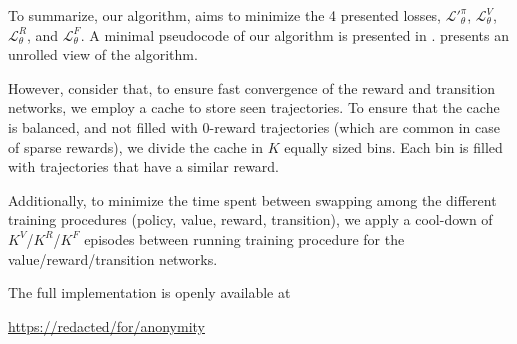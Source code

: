 To summarize, our algorithm, aims to minimize the 4 presented losses, $\mathcal{L'}_\theta^{\pi}$, $\mathcal{L}_\theta^V$, $\mathcal{L}_\theta^R$, and $\mathcal{L}_\theta^F$. A minimal pseudocode of our algorithm is presented in .  presents an unrolled view of the \fname{} algorithm.

However, consider that, to ensure fast convergence of the reward and transition networks, we employ a cache to store seen trajectories. To ensure that the cache is balanced, and not filled with $0$-reward trajectories (which are common in case of sparse rewards), we divide the cache in $K$ equally sized bins. Each bin is filled with trajectories that have a similar reward. 

Additionally, to minimize the time spent between swapping among the different training procedures (policy, value, reward, transition), we apply a cool-down of $K^V$/$K^R$/$K^F$ episodes between running training procedure for the value/reward/transition networks. 

The full implementation is openly available at 
\begin{center}
\url{https://redacted/for/anonymity}
\end{center}




